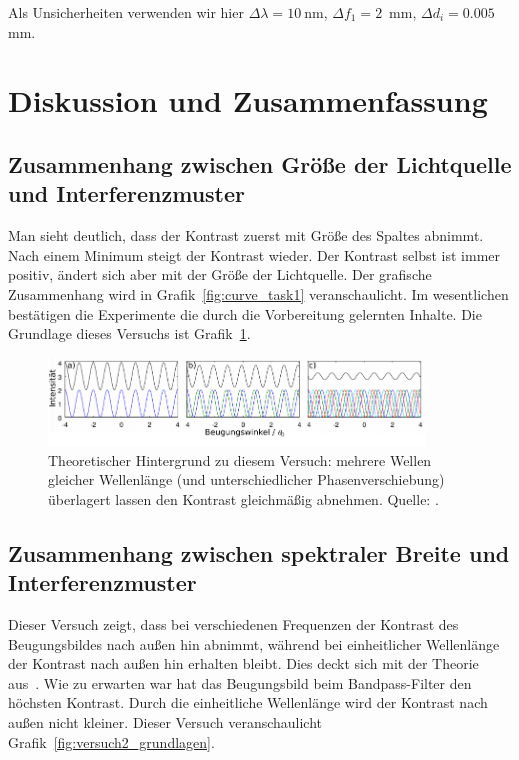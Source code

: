 \documentclass{article}
\begin{document}
Als Unsicherheiten verwenden wir hier $\Delta\lambda=10~$nm, $\Delta f_1 = 2$~mm, $\Delta d_i = 0.005~$mm.

\newpage
\section{Diskussion und Zusammenfassung}

\subsection{Zusammenhang zwischen Größe der Lichtquelle und Interferenzmuster}

Man sieht deutlich, dass der Kontrast zuerst mit Größe des Spaltes abnimmt. Nach einem Minimum steigt der Kontrast wieder. Der Kontrast selbst ist immer positiv, ändert sich aber mit der Größe der Lichtquelle. Der grafische Zusammenhang wird in Grafik~\ref{fig:curve_task1} veranschaulicht. Im wesentlichen bestätigen die Experimente die durch die Vorbereitung gelernten Inhalte. Die Grundlage dieses Versuchs ist Grafik~\ref{fig:versuch1_grundlagen}.


\begin{figure}[H]
\caption{Theoretischer Hintergrund zu diesem Versuch: mehrere Wellen gleicher Wellenlänge (und unterschiedlicher Phasenverschiebung) überlagert lassen den Kontrast gleichmäßig abnehmen. Quelle: \cite{quelle6}.}
\label{fig:versuch1_grundlagen}
\includegraphics[width=10cm]{diskussion2.png}
\end{figure}




\subsection{Zusammenhang zwischen spektraler Breite und Interferenzmuster}


Dieser Versuch zeigt, dass bei verschiedenen Frequenzen der Kontrast des Beugungsbildes nach außen hin abnimmt, während bei einheitlicher Wellenlänge der Kontrast nach außen hin erhalten bleibt. Dies deckt sich mit der Theorie aus~\cite{quelle6}. Wie zu erwarten war hat das Beugungsbild beim Bandpass-Filter den höchsten Kontrast. Durch die einheitliche Wellenlänge wird der Kontrast nach außen nicht kleiner. Dieser Versuch veranschaulicht Grafik~\ref{fig:versuch2_grundlagen}.
\end{document}
